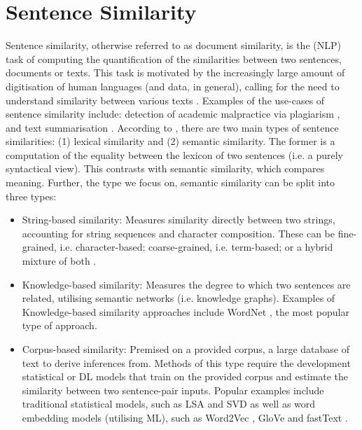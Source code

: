 \documentclass[10pt,oneside]{report}
\begin{document}
\section{Sentence Similarity}\label{sec:sentenceSimilarity}
Sentence similarity, otherwise referred to as document similarity, is the (NLP) task of computing the quantification of the similarities between two sentences, documents or texts. This task is motivated by the increasingly large amount of digitisation of human languages (and data, in general), calling for the need to understand similarity between various texts \cite{raju2022sentence}. Examples of the use-cases of sentence similarity include: detection of academic malpractice via plagiarism \cite{lukashenko2007computer, baba2017plagiarism}, and text summarisation \cite {aliguliyev2009new, kumar2020semantic, jo2017k}. According to \cite{raju2022sentence}, there are two main types of sentence similarities: (1) lexical similarity and (2) semantic similarity. The former is a computation of the equality between the lexicon of two sentences (i.e. a purely syntactical view). This contrasts with semantic similarity, which compares meaning. Further, the type we focus on, semantic similarity can be split into three types: 

\begin{itemize}
    \item String-based similarity: Measures similarity directly between two strings, accounting for string sequences and character composition. These can be fine-grained, i.e. character-based; coarse-grained, i.e. term-based; or a hybrid mixture of both \cite{yu2016string}.
    \item Knowledge-based similarity: Measures the degree to which two sentences are related, utilising semantic networks (i.e. knowledge graphs). Examples of Knowledge-based similarity approaches include WordNet \cite{budanitsky2001semantic}, the most popular type of approach.
    \item Corpus-based similarity: Premised on a provided corpus, a large database of text to derive inferences from. Methods of this type require the development statistical or DL models that train on the provided corpus and estimate the similarity between two sentence-pair inputs. Popular examples include traditional statistical models, such as LSA \cite{landauer1998introduction} and SVD \cite{steinberger2005text} as well as word embedding models (utilising ML), such as Word2Vec \cite{bojanowski2017enriching}, GloVe \cite{pennington2014glove} and fastText \cite{mikolov2013efficient}.
\end{itemize}
\end{document}
